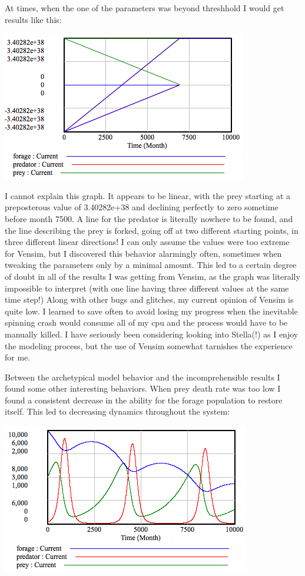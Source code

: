 \documentclass[12pt]{article}
\begin{document}
At times, when the one of the parameters was beyond threshhold I would get results like this:

\includegraphics[scale=0.8]{incoherentresults.png}

I cannot explain this graph.  It appears to be linear, with the prey starting at a preposterous value of 3.40282e+38 and declining perfectly to zero sometime before month 7500.  A line for the predator is literally nowhere to be found, and the line describing the prey is forked, going off at two different starting points, in three different linear directions!  I can only assume the values were too extreme for Vensim, but I discovered this behavior alarmingly often, sometimes when tweaking the parameters only by a minimal amount.  This led to a certain degree of doubt in all of the results I was getting from Vensim, as the graph was literally impossible to interpret (with one line having three different values at the same time step!)  Along with other bugs and glitches, my current opinion of Vensim is quite low.  I learned to save often to avoid losing my progress when the inevitable spinning crash would consume all of my cpu and the process would have to be manually killed.  I have seriously been considering looking into Stella(!) as I enjoy the modeling process, but the use of Vensim somewhat tarnishes the experience for me.  

Between the archetypical model behavior and the incomprehensible results I found some other interesting behaviors.  When prey death rate was too low I found a consistent decrease in the ability for the forage population to restore itself.  This led to decreasing dynamics throughout the system:

\includegraphics[scale=0.8]{decliningforage.png}
\end{document}
